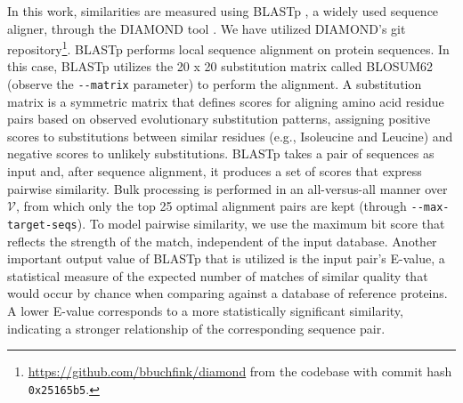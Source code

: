 In this work, similarities are measured using BLASTp \cite{blast}, a widely used sequence aligner, through the
DIAMOND tool \cite{diamond}. We have utilized DIAMOND's git repository\footnote{\url{https://github.com/bbuchfink/diamond} from the codebase with commit hash \texttt{0x25165b5}.}. BLASTp performs local sequence alignment on protein sequences. In this case, BLASTp
utilizes the 20 x 20 substitution matrix called BLOSUM62 (observe the
\texttt{-{}-matrix} parameter) to perform the alignment. A substitution matrix is a symmetric matrix that defines
scores for aligning amino acid residue pairs based on observed evolutionary
substitution patterns, assigning positive scores to substitutions between
similar residues (e.g., Isoleucine and Leucine) and negative scores to unlikely
substitutions. BLASTp takes a pair of sequences as input and, after
sequence alignment, it produces a set of scores that express pairwise
similarity. Bulk processing is performed in an all-versus-all manner over
\(\mathscr{V}\), from which only the top 25 optimal alignment pairs are kept
(through \texttt{-{}-max-target-seqs}).
To model pairwise similarity, we use the maximum bit score that reflects the
strength of the match, independent of the input database. Another important output
value of BLASTp that is utilized is the input pair's E-value, a statistical
measure of the expected number of matches of similar quality that would occur
by chance when comparing against a database of reference proteins. A lower
E-value corresponds to a more statistically significant similarity, indicating
a stronger relationship of the corresponding sequence pair.


